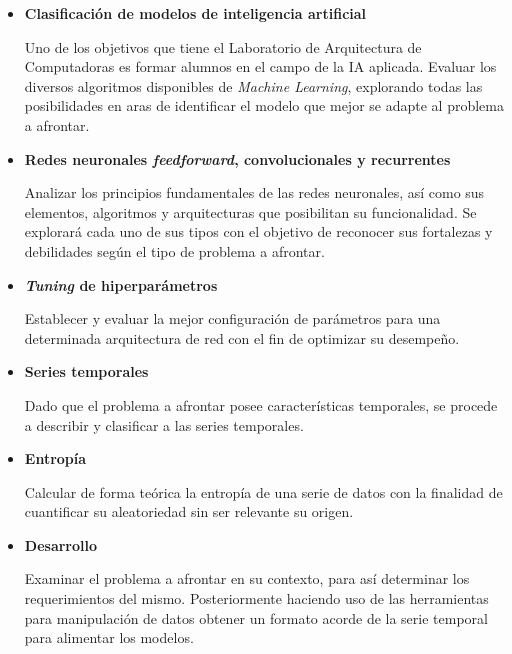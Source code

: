 \documentclass[a4paper,12pt]{article}
\begin{document}
\begin{itemize}
	\item \textbf{Clasificación de modelos de inteligencia artificial}
	      	      	
	      Uno de los objetivos que tiene el Laboratorio de Arquitectura de Computadoras es formar alumnos en el campo de la IA aplicada. Evaluar los diversos algoritmos disponibles de \textit{Machine Learning}, explorando todas las posibilidades en aras de identificar el modelo que mejor se adapte al problema a afrontar.
	      	      	
	\item \textbf{Redes neuronales \textit{feedforward}, convolucionales y recurrentes}
	      	      	
	      Analizar los principios fundamentales de las redes neuronales, así como sus elementos, algoritmos y arquitecturas que posibilitan su funcionalidad. Se explorará cada uno de sus tipos con el objetivo de reconocer sus fortalezas y debilidades según el tipo de problema a afrontar.
	      	      	
	\item \textbf{\textit{Tuning} de hiperparámetros}
	      	      	
	      Establecer y evaluar la mejor configuración de parámetros para una determinada arquitectura de red con el fin de optimizar su desempeño.
	      	      	
	\item \textbf{Series temporales}
	      	      	
	      Dado que el problema a afrontar posee características temporales, se procede a describir y clasificar a las series temporales.
	      	      	
	\item \textbf{Entropía}
	      	      	
	      Calcular de forma teórica la entropía de una serie de datos con la finalidad de cuantificar su aleatoriedad sin ser relevante su origen.
	      	      	
	\item \textbf{Desarrollo}
	      	      	
	      Examinar el problema a afrontar en su contexto, para así determinar los requerimientos del mismo. Posteriormente haciendo uso de las herramientas para manipulación de datos obtener un formato acorde de la serie temporal para alimentar los modelos.
	      	      	
\end{itemize}
\end{document}
